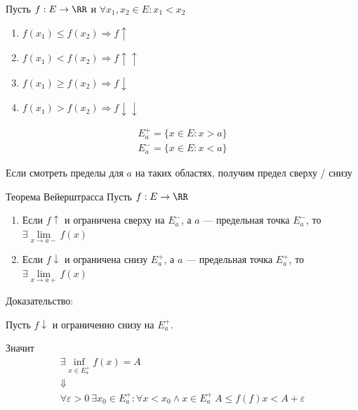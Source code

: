\begin{defn}{}{}
    Пусть \( f : E \to \RR \) и \( \forall x_1, x_2 \in E : x_1 < x_2 \)
    \begin{enumerate}
        \item
            \( f(x_1) \leq f(x_2) \Rightarrow f \uparrow \)
        \item
            \( f(x_1) < f(x_2) \Rightarrow f \uparrow \uparrow \)
        \item
            \( f(x_1) \geq f(x_2) \Rightarrow f \downarrow \)
        \item
            \( f(x_1) > f(x_2) \Rightarrow f \downarrow \downarrow \)
    \end{enumerate}
\end{defn}

\newpage

\begin{defn}{}{}
    \begin{gather*}
        E_a^+ = \{ x \in E : x > a \}
        \\
        E_a^- = \{ x \in E : x < a \}
    \end{gather*}

    Если смотреть пределы для \( a \) на таких областях, получим предел сверху / снизу
\end{defn}

\begin{thrm}{Теорема Вейерштрасса}{}
    Пусть \( f : E \to \RR \)
    \begin{enumerate}
        \item
            Если \( f \uparrow \) и ограничена сверху на \( E_a^- \),
            а \( a \) --- предельная точка \( E_a^- \),
            то \( \exists \lim\limits_{x \to a-} f(x) \)
        \item
            Если \( f \downarrow \) и ограничена снизу \( E_a^+ \),
            а \( a \) --- предельная точка \( E_a^+ \),
            то \( \exists \lim\limits_{x \to a+} f(x) \)
    \end{enumerate}
\end{thrm}

Доказательство:

Пусть \( f \downarrow \) и ограниченно снизу на \( E_a^+ \).

Значит
\begin{gather*}
    \exists \inf\limits_{x \in E_a^+} f(x) = A
    \\
    \Downarrow
    \\
    \forall \varepsilon > 0 \ \exists x_0 \in E_a^+ : \forall x < x_0 \land x \in E_a^+
        \ A \leq f(f)x < A + \varepsilon
\end{gather*}

